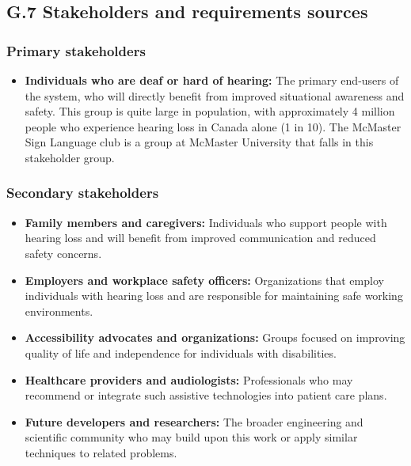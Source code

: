 \documentclass[12pt]{article}
\theoremstyle{definition}
\begin{document}
\subsection{G.7 Stakeholders and requirements sources}

\subsubsection{Primary stakeholders}

\begin{itemize}
\item \textbf{Individuals who are deaf or hard of hearing:}
\label{stakeholder:hardHearing} The primary
end-users of the system, who will directly benefit from improved
situational awareness and safety. This group is quite large in population,
with approximately 4 million people who experience hearing loss 
in Canada alone (1 in 10). The McMaster Sign Language club is a group at
McMaster University that falls in this stakeholder group.

\end{itemize}

\subsubsection{Secondary stakeholders}

\begin{itemize}
\item \textbf{Family members and caregivers:} Individuals who support people
with hearing loss and will benefit from improved communication and reduced
safety concerns.

\item \textbf{Employers and workplace safety officers:} Organizations that
employ individuals with hearing loss and are responsible for maintaining
safe working environments.

\item \textbf{Accessibility advocates and organizations:} Groups focused on
improving quality of life and independence for individuals with disabilities.

\item \textbf{Healthcare providers and audiologists:} Professionals who may
recommend or integrate such assistive technologies into patient care plans.

\item \textbf{Future developers and researchers:} The broader engineering
and scientific community who may build upon this work or apply similar
techniques to related problems.
\end{itemize}
\end{document}
